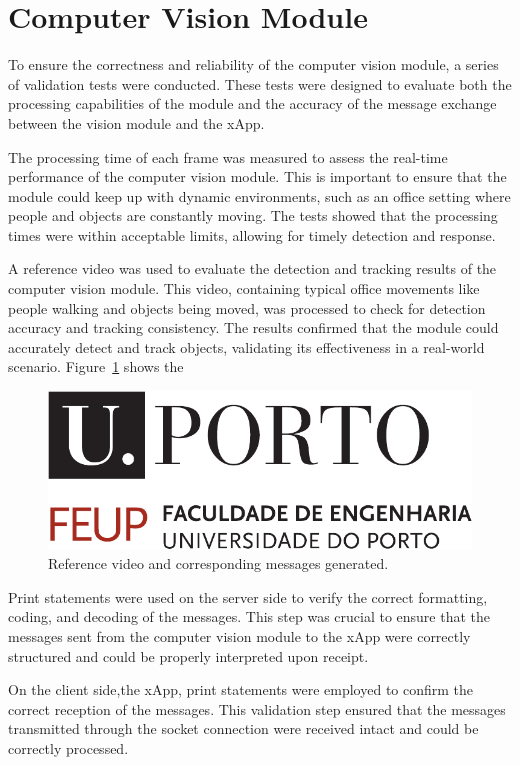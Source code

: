 \section{Computer Vision Module}\label{sec:cv_module}
To ensure the correctness and reliability of the computer vision module, a series of validation tests were conducted.
These tests were designed to evaluate both the processing capabilities of the module and the accuracy of the message exchange between the vision module and the xApp.

The processing time of each frame was measured to assess the real-time performance of the computer vision module.
This is important to ensure that the module could keep up with dynamic environments, such as an office setting where people and objects are constantly moving.
The tests showed that the processing times were within acceptable limits, allowing for timely detection and response.

A reference video was used to evaluate the detection and tracking results of the computer vision module.
This video, containing typical office movements like people walking and objects being moved, was processed to check for detection accuracy and tracking consistency.
The results confirmed that the module could accurately detect and track objects, validating its effectiveness in a real-world scenario.
Figure~\ref{fig:reference_video} shows the

\begin{figure}[H]
    \centering
    \includegraphics[width=0.5\linewidth]{figures/uporto-feup}
    \caption{Reference video and corresponding messages generated.}
    \label{fig:reference_video}
\end{figure}

Print statements were used on the server side to verify the correct formatting, coding, and decoding of the messages.
This step was crucial to ensure that the messages sent from the computer vision module to the xApp were correctly structured and could be properly interpreted upon receipt.

On the client side,the xApp, print statements were employed to confirm the correct reception of the messages.
This validation step ensured that the messages transmitted through the socket connection were received intact and could be  correctly processed.

